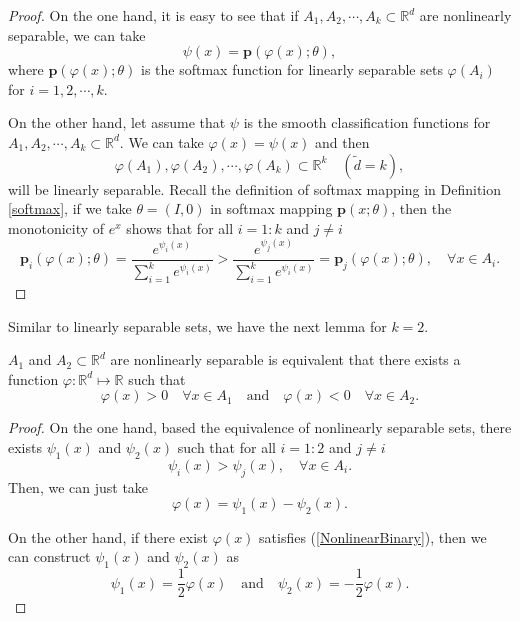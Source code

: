\begin{proof}
	On the one hand, it is easy to see that if $A_1, A_2, \cdots, A_k \subset \mathbb{R}^d$ are nonlinearly separable, we can take 
	\begin{equation}\label{key}
	\psi(x) = \bm p(\varphi(x); \theta),
	\end{equation}	
	where $\bm p(\varphi(x); \theta)$ is the softmax function for linearly separable sets $\varphi(A_i)$ for $i=1,2,\cdots,k$.
	
	On the other hand, let assume that $\psi$ is the smooth classification functions for $A_1, A_2, \cdots, A_k \subset \mathbb{R}^d$. 
	We can take $\varphi(x) = \psi(x)$ and then
	\begin{equation}\label{key}
	\varphi(A_1), \varphi(A_2), \cdots, \varphi(A_k) \subset \mathbb{R}^k \quad ( \tilde d = k),
	\end{equation}
	will be linearly separable. Recall the definition of softmax mapping in Definition \ref{softmax}, if we take $\theta = (I, 0)$ in softmax mapping $\bm p(x;\theta)$, 
	then the monotonicity of $e^x$ shows that for all $i = 1:k$ and $ j \neq i$
	\begin{equation}\label{key}
	\bm p_i ( \varphi(x);\theta) = \frac{e^{\psi_i(x)}}{\sum_{i=1}^k e^{\psi_i(x)}} > \frac{e^{\psi_j(x)}}{\sum_{i=1}^k e^{\psi_i(x)}} = \bm p_j ( \varphi(x);\theta) , \quad \forall x \in A_i.
	\end{equation}
	
\end{proof}


Similar to linearly separable sets, we have the next lemma for $k=2$.
\begin{lemma}$A_1$ and $A_2 \subset \mathbb{R}^d$ are nonlinearly separable  is equivalent that there  
	exists a function $\varphi: \mathbb{R}^d \mapsto \mathbb{R}$ such that
	\begin{equation}\label{NonlinearBinary}
	\varphi(x) > 0 \quad \forall x \in A_1 \quad \text{and} \quad 	\varphi(x) < 0 \quad \forall x \in A_2.
	\end{equation}
\end{lemma}

\begin{proof}
On the one hand, based the equivalence of nonlinearly separable sets, there exists $\psi_1(x)$ and $\psi_2(x)$ such that 
for all $i = 1:2$ and $ j \neq i$
\begin{equation}\label{key}
\psi_i (x) > \psi_j (x), \quad \forall x \in A_i.
\end{equation}
Then, we can just take 
\begin{equation}\label{key}
\varphi(x) = \psi_1 (x) - \psi_2 (x).
\end{equation}

On the other hand, if there exist $\varphi(x)$ satisfies (\ref{NonlinearBinary}), then we can construct $\psi_1(x)$ and $\psi_2(x)$ as
\begin{equation}\label{key}
\psi_1(x) =  \frac{1}{2}\varphi(x) \quad \text{and}\quad 
\psi_2(x) = -\frac{1}{2}\varphi(x).
\end{equation}
\end{proof}


